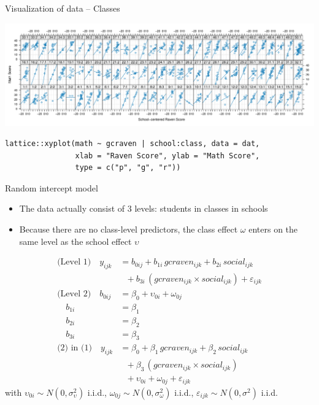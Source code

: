 \documentclass[aspectratio=169]{beamer}
\begin{document}
\begin{frame}[fragile]{Visualization of data -- Classes}
  \begin{center}
      \includegraphics[scale=.38]{../figures/jsp_lattice2}
  \end{center}
\begin{lstlisting}
lattice::xyplot(math ~ gcraven | school:class, data = dat,
                xlab = "Raven Score", ylab = "Math Score",
                type = c("p", "g", "r"))
\end{lstlisting}

\end{frame}

\begin{frame}{Random intercept model}
  \begin{itemize}
    \item The data actually consist of 3 levels: students in classes in
      schools
    \item Because there are no class-level predictors, the class effect
      $\omega$ enters on the same level as the school effect $\upsilon$
  \end{itemize}
\begin{align*}
\text{(Level 1)} \quad y_{ijk} &= b_{0ij} + b_{1i}\,gcraven_{ijk} + b_{2i}\,social_{ijk}\\
                  &~~~+ b_{3i}\,(gcraven_{ijk} \times social_{ijk}) +
                  \varepsilon_{ijk}\\
  \text{(Level 2)} \quad b_{0ij} &= \beta_0 + \upsilon_{0i} + \omega_{0j}\\
                  \quad b_{1i} &= \beta_1\\
                  \quad b_{2i} &= \beta_2\\
                  \quad b_{3i} &= \beta_3\\
\text{(2) in (1)} \quad y_{ijk} &= \beta_{0} + \beta_{1}\,gcraven_{ijk} +
  \beta_{2}\,social_{ijk}\\
                              &~~~ + \beta_{3}\,(gcraven_{ijk} \times social_{ijk})\\
                              &~~~ + \upsilon_{0i} + \omega_{0j} +
                              \varepsilon_{ijk}
\end{align*}
  \hspace{-.1cm}with $\upsilon_{0i} \sim N(0, \sigma^2_{\upsilon})$ i.i.d.,
$\omega_{0j} \sim N(0, \sigma^2_{\omega})$ i.i.d.,
$\varepsilon_{ijk} \sim N(0, \sigma^2)$ i.i.d.
\end{frame}
\end{document}
